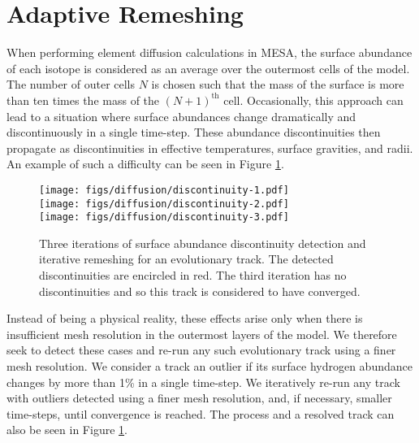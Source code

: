 \documentclass[twocolumn,twocolappendix]{aastex6}
\newcommand{\colwidth}{\linewidth}
\begin{document}
\section{Adaptive Remeshing}
\label{sec:remeshing}

When performing element diffusion calculations in MESA, the surface abundance of each isotope is considered as an average over the outermost cells of the model. The number of outer cells $N$ is chosen such that the mass of the surface is more than ten times the mass of the $(N+1)^{\text{th}}$ cell. Occasionally, this approach can lead to a situation where surface abundances change dramatically and discontinuously in a single time-step. These abundance discontinuities then propagate as discontinuities in effective temperatures, surface gravities, and radii. An example of such a difficulty can be seen in Figure \ref{fig:discontinuity}. 

\begin{figure}
    \centering
    \texttt{[image: figs/diffusion/discontinuity-1.pdf]}\\
    \texttt{[image: figs/diffusion/discontinuity-2.pdf]}\\
    \texttt{[image: figs/diffusion/discontinuity-3.pdf]}\\
    \caption{Three iterations of surface abundance discontinuity detection and iterative remeshing for an evolutionary track. The detected discontinuities are encircled in red. The third iteration has no discontinuities and so this track is considered to have converged. \vspace*{5mm} \label{fig:discontinuity} }
\end{figure}

Instead of being a physical reality, these effects arise only when there is insufficient mesh resolution in the outermost layers of the model. We therefore seek to detect these cases and re-run any such evolutionary track using a finer mesh resolution. We consider a track an outlier if its surface hydrogen abundance changes by more than 1\% in a single time-step. We iteratively re-run any track with outliers detected using a finer mesh resolution, and, if necessary, smaller time-steps, until convergence is reached. The process and a resolved track can also be seen in Figure \ref{fig:discontinuity}. 
\end{document}
